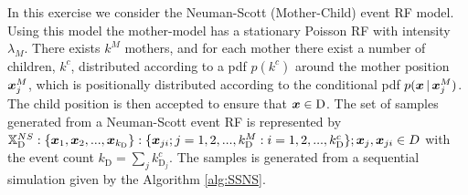 \section{}
\label{sec:problem3}
In this exercise we consider the Neuman-Scott (Mother-Child) event RF model. Using this model the mother-model has a stationary Poisson RF with intensity $\lambda_M$. There exists $k^M$ mothers, and for each mother there exist a number of children, $k^c$, distributed according to a pdf $p(k^c)$ around the mother position $\bm{x}_j^M$, which is positionally distributed according to the conditional pdf $p(\bm{x} \, | \, \bm{x}_j^M)$. The child position is then accepted to ensure that $\bm{x} \in \textrm{D}$. The set of samples generated from a Neuman-Scott event RF  is represented by
$\mathbb{X}_\textrm{D}^{NS}:\{\bm{x}_1,\bm{x}_2,...,\bm{x}_{k_\textrm{D}}\}:\{\bm{x}_{ji};j=1,2,...,k_\textrm{D}^M:i = 1,2,...,k_\textrm{D}^c\};\bm{x}_j,\bm{x}_{ji}\in D$ with the event count $k_\textrm{D} = \sum_j k_{\textrm{D}_j}^c$. The samples is generated from a sequential simulation given by the Algorithm \ref{alg:SSNS}.

